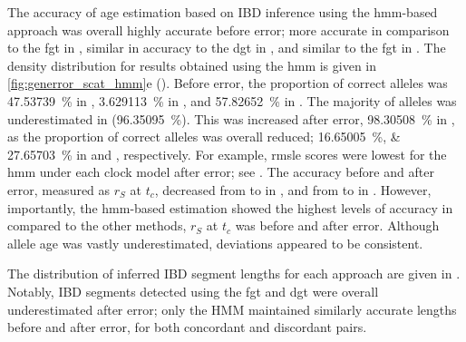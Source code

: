 The accuracy of age estimation based on IBD inference using the \gls{hmm}-based approach was overall highly accurate before error; more accurate in comparison to the \gls{fgt} in \ClockM, similar in accuracy to the \gls{dgt} in \ClockR, and similar to the \gls{fgt} in \ClockC.
The density distribution for results obtained using the \gls{hmm} is given in \cref{fig:generror_scat_hmm}{e} ().
Before error, the proportion of correct alleles was \SI{47.53739}{\percent} in \ClockM, \SI{3.629113}{\percent} in \ClockR, and \SI{57.82652}{\percent} in \ClockC.
The majority of alleles was underestimated in \ClockR (\SI{96.35095}{\percent}).
This was increased after error, \ie \SI{98.30508}{\percent} in \ClockR, as the proportion of correct alleles was overall reduced; \SIlist{16.65005;27.65703}{\percent} in \ClockM and \ClockC, respectively.
For example, \gls{rmsle} scores were lowest for the \gls{hmm} under each clock model after error; see .
The accuracy before and after error, measured as $r_S$ at $t_c$, decreased from  to  in \ClockM, and from  to  in \ClockC.
However, importantly, the \gls{hmm}-based estimation showed the highest levels of accuracy in \ClockR compared to the other methods, \ie $r_S$ at $t_c$ was  before and  after error.
Although allele age was vastly underestimated, deviations appeared to be consistent.

%

%

The distribution of inferred IBD segment lengths for each approach are given in .
Notably, IBD segments detected using the \gls{fgt} and \gls{dgt} were overall underestimated after error; only the HMM maintained similarly accurate lengths before and after error, for both concordant and discordant pairs.


%

%








